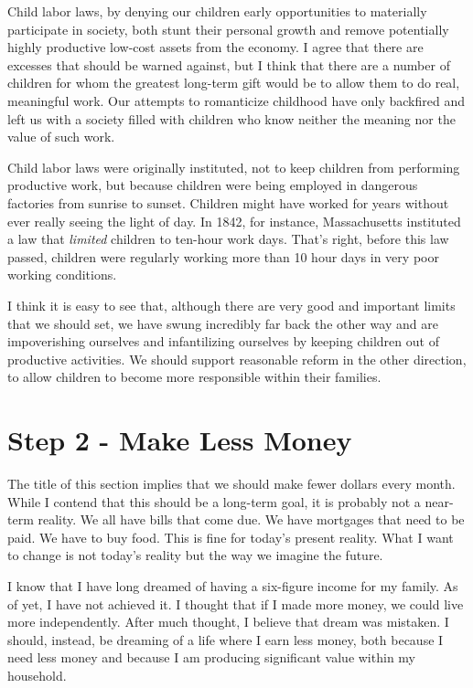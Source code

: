 \documentclass[letterpaper]{article}
\begin{document}
{\color{black}
Child labor laws, by denying our children early opportunities to
materially participate in society, both stunt their personal growth and
remove potentially highly productive low-cost assets from the economy.
I agree that there are excesses that should be warned against, but I
think that there are a number of children for whom the greatest
long-term gift would be to allow them to do real, meaningful work. Our
attempts to romanticize childhood have only backfired and left us with
a society filled with children who know neither the meaning nor the
value of \textcolor[rgb]{0.32941177,0.5529412,0.83137256}{such} work.}

{\color{black}
Child labor laws were originally instituted, not to keep children from
performing productive work, but because children were being employed in
dangerous factories from sunrise to sunset. Children might
\textcolor[rgb]{0.32941177,0.5529412,0.83137256}{have
}worke\textcolor[rgb]{0.32941177,0.5529412,0.83137256}{d} for years
without ever really seeing the light of day. In 1842, for instance,
Massachusetts instituted a law that \textit{limited} children to
ten-hour work days. That’s right, before this law passed, children were
regularly working more than 10 hour days in very poor working
conditions.}

{\color{black}
I think it is easy to see that, although there are very good and
important limits that we should set, we have swung incredibly far back
the other way and are impoverishing ourselves and infantilizing
ourselves by keeping children out of productive activities. We should
support reasonable reform in the other direction, to allow children to
become more responsible within their families. }

\section{Step 2 - Make Less Money}
{\color{black}
The title of this section implies that we should make fewer dollars
every month. While I contend that this should be a long-term goal, it
is probably not a near-term reality. We all have bills that come due.
We have mortgages that need to be paid. We have to buy food. This is
fine for today’s present reality. What I want to change is not
\textcolor[rgb]{0.32941177,0.5529412,0.83137256}{today’s reality but
the way we imagine the future.}}

{\color{black}
I know that I have long dreamed of having a six-figure income for my
family. As of yet, I have not achieved it. I thought that if I made
more money, we could live more independently. After much thought, I
believe that dream was mistaken. I should, instead, be dreaming of a
life where I earn less money, both because I need less money and
because I am producing significant value within my household.}
\end{document}

